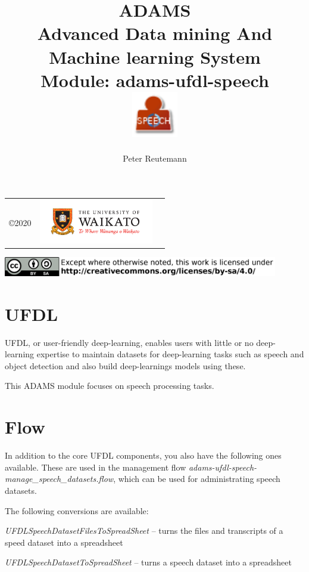 \documentclass[a4paper]{book}
\title{
  \textbf{ADAMS} \\
  {\Large \textbf{A}dvanced \textbf{D}ata mining \textbf{A}nd \textbf{M}achine
  learning \textbf{S}ystem} \\
  {\Large Module: adams-ufdl-speech} \\
  \vspace{1cm}
  \includegraphics[width=2cm]{images/ufdl-speech-module.png} \\
}
\author{
  Peter Reutemann
}
\begin{document}
\begin{titlepage}
\maketitle

\thispagestyle{empty}
\center
\begin{table}[b]
	\begin{tabular}{c l l}
		\parbox[c][2cm]{2cm}{\copyright 2020} &
		\parbox[c][2cm]{5cm}{\includegraphics[width=5cm]{images/coat_of_arms.pdf}} \\
	\end{tabular}
	\includegraphics[width=12cm]{images/cc.png} \\
\end{table}

\end{titlepage}

\tableofcontents

\chapter{UFDL}
UFDL, or user-friendly deep-learning, enables users with little or no deep-learning
expertise to maintain datasets for deep-learning tasks such as speech
and object detection and also build deep-learnings models using these.

This ADAMS module focuses on speech processing tasks.

\chapter{Flow}

In addition to the core UFDL components, you also have the following ones available.
These are used in the management flow \textit{adams-ufdl-speech-manage\_speech\_datasets.flow},
which can be used for administrating speech datasets.

The following conversions are available:
\begin{tight_itemize}
  \item \textit{UFDLSpeechDatasetFilesToSpreadSheet} -- turns the files and transcripts of a speed dataset into a spreadsheet
  \item \textit{UFDLSpeechDatasetToSpreadSheet} -- turns a speech dataset into a spreadsheet
\end{tight_itemize}
\end{document}
